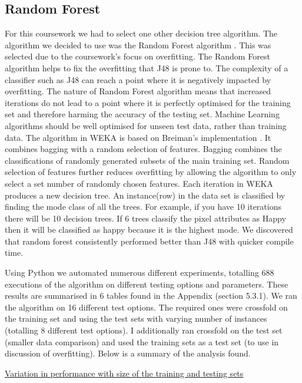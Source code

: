 \subsection{Random Forest}
\label{sec:dt:rf}
For this coursework we had to select one other decision tree algorithm. The algorithm we decided to use was the Random Forest algorithm \autocite{Breiman2001}. This was selected due to the coursework's focus on overfitting. The Random Forest algorithm helps to fix the overfitting that J48 is prone to. The complexity of a classifier such as J48 can reach a point where it is negatively impacted by overfitting. The nature of Random Forest algorithm means that increased iterations do not lead to a point where it is perfectly optimised for the training set and therefore harming the accuracy of the testing set. Machine Learning algorithms should be well optimised for unseen test data, rather than training data. The algorithm in WEKA is based on Breiman's implementation \autocite{Breiman2001}. It combines bagging with a random selection of features. Bagging combines the classifications of randomly generated subsets of the main training set. Random selection of features further reduces overfitting by allowing the algorithm to only select a set number of randomly chosen features. Each iteration in WEKA produces a new decision tree. An instance(row) in the data set is classified by finding the mode class of all the trees. For example, if you have 10 iterations there will be 10 decision trees. If 6 trees classify the pixel attributes as Happy then it will be classified as happy because it is the highest mode. We discovered that random forest consistently performed better than J48 with quicker compile time.

Using Python we automated numerous different experiments, totalling 688 executions of the algorithm on different testing options and parameters. These results are summarised in 6 tables found in the Appendix (section 5.3.1). We ran the algorithm on 16 different test options. The required ones were crossfold on the training set and using the test sets with varying number of instances (totalling 8 different test options). I additionally ran crossfold on the test set (smaller data comparison) and used the training sets as a test set (to use in discussion of overfitting). Below is a summary of the analysis found.  

\raggedright\underline{Variation in performance with size of the training and testing sets}

